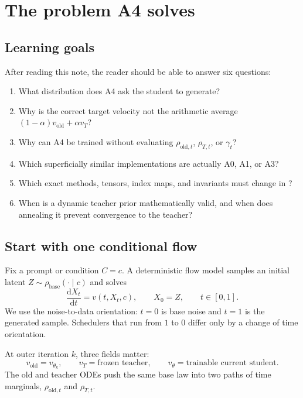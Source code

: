 \documentclass[11pt,a4paper]{article}
\newcommand{\dd}{\mathrm{d}}
\newcommand{\vold}{v_{\mathrm{old}}}
\newcommand{\vT}{v_T}
\newcommand{\vtheta}{v_\theta}
\theoremstyle{plain}
\theoremstyle{definition}
\begin{document}
\section{The problem A4 solves}
\label{sec:problem}

\subsection{Learning goals}

After reading this note, the reader should be able to answer six questions:
\begin{enumerate}[leftmargin=1.6em]
\item What distribution does A4 ask the student to generate?
\item Why is the correct target velocity not the arithmetic average
      $(1-\alpha)\vold+\alpha\vT$?
\item Why can A4 be trained without evaluating $\rho_{\mathrm{old},t}$,
      $\rho_{T,t}$, or $\gamma_t$?
\item Which superficially similar implementations are actually A0, A1, or A3?
\item Which exact methods, tensors, index maps, and invariants must change in
      ?
\item When is a dynamic teacher prior mathematically valid, and when does annealing it prevent
      convergence to the teacher?
\end{enumerate}

\subsection{Start with one conditional flow}

Fix a prompt or condition $C=c$.  A deterministic flow model samples an initial latent
$Z\sim\rho_{\mathrm{base}}(\cdot\mid c)$ and solves
\begin{equation}
\frac{\dd X_t}{\dd t}=v(t,X_t,c),
\qquad
X_0=Z,
\qquad
t\in[0,1].
\label{eq:basic-ode}
\end{equation}
We use the noise-to-data orientation: $t=0$ is base noise and $t=1$ is the generated sample.
Schedulers that run from $1$ to $0$ differ only by a change of time orientation.

At outer iteration $k$, three fields matter:
\begin{equation}
\vold=v_{\theta_k},
\qquad
\vT=\text{frozen teacher},
\qquad
\vtheta=\text{trainable current student}.
\label{eq:three-fields}
\end{equation}
The old and teacher ODEs push the same base law into two paths of time marginals,
$\rho_{\mathrm{old},t}$ and $\rho_{T,t}$.
\end{document}
